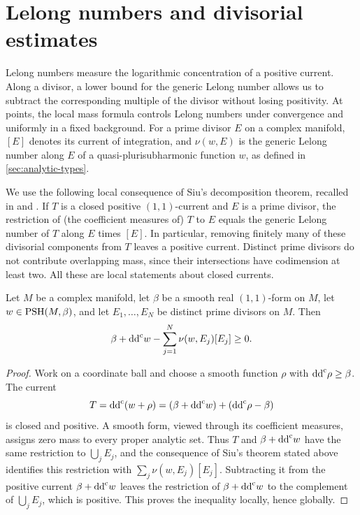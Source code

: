 \section{Lelong numbers and divisorial estimates}
\label{sec:psh-divisorial-estimates}

Lelong numbers measure the logarithmic concentration of a positive current. Along a divisor, a lower bound for the generic Lelong number allows us to subtract the corresponding multiple of the divisor without losing positivity. At points, the local mass formula controls Lelong numbers under convergence and uniformly in a fixed background. For a prime divisor $E$ on a complex manifold, $[E]$ denotes its current of integration, and $\nu(w,E)$ is the generic Lelong number along $E$ of a quasi-plurisubharmonic function $w$, as defined in \cref{sec:analytic-types}.

We use the following local consequence of Siu's decomposition theorem, recalled in \cite{SGPT} and \cite{DemAM11}. If $T$ is a closed positive $(1,1)$-current and $E$ is a prime divisor, the restriction of (the coefficient measures of) $T$ to $E$ equals the generic Lelong number of $T$ along $E$ times $[E]$. In particular, removing finitely many of these divisorial components from $T$ leaves a positive current. Distinct prime divisors do not contribute overlapping mass, since their intersections have codimension at least two. All these are local statements about closed currents.

\begin{lemma}\label{lem:nonclosed-divisorial-removal}
Let $M$ be a complex manifold, let $\beta$ be a smooth real $(1,1)$-form on $M$, let $w\in\mathrm{PSH}(M,\beta)$, and let $E_1,\ldots,E_N$ be distinct prime divisors on $M$. Then
\[
 \beta+\mathrm{dd}^{\mathrm{c}} w-\sum_{j=1}^N\nu(w,E_j)[E_j]\geq0.
\]
\end{lemma}
\begin{proof}
Work on a coordinate ball and choose a smooth function $\rho$ with $\mathrm{dd}^{\mathrm{c}}\rho\geq\beta$. The current
\[
 T=\mathrm{dd}^{\mathrm{c}}(w+\rho)=(\beta+\mathrm{dd}^{\mathrm{c}} w)+(\mathrm{dd}^{\mathrm{c}}\rho-\beta)
\]
is closed and positive. A smooth form, viewed through its coefficient measures, assigns zero mass to every proper analytic set. Thus $T$ and $\beta+\mathrm{dd}^{\mathrm{c}} w$ have the same restriction to $\bigcup_jE_j$, and the consequence of Siu's theorem stated above identifies this restriction with $\sum_j\nu(w,E_j)[E_j]$. Subtracting it from the positive current $\beta+\mathrm{dd}^{\mathrm{c}} w$ leaves the restriction of $\beta+\mathrm{dd}^{\mathrm{c}} w$ to the complement of $\bigcup_jE_j$, which is positive. This proves the inequality locally, hence globally.
\end{proof}

